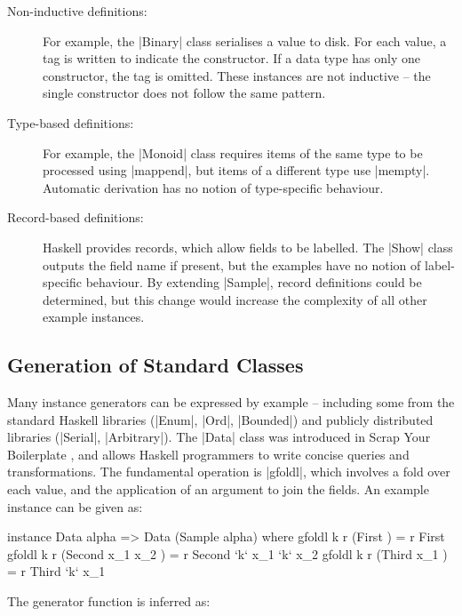 \documentclass[preprint,draft]{sigplanconf}
\begin{document}
\begin{description}

\item[Non-inductive definitions:] For example, the |Binary| class serialises a value to disk. For each value, a tag is written to indicate the constructor. If a data type has only one constructor, the tag is omitted. These instances are not inductive -- the single constructor does not follow the same pattern.

\item[Type-based definitions:] For example, the |Monoid| class requires items of the same type to be processed using |mappend|, but items of a different type use |mempty|. Automatic derivation has no notion of type-specific behaviour.

\item [Record-based definitions:] Haskell provides records, which allow fields to be labelled. The |Show| class outputs the field name if present, but the examples have no notion of label-specific behaviour. By extending |Sample|, record definitions could be determined, but this change would increase the complexity of all other example instances.

\end{description}

\subsection{Generation of Standard Classes}
\label{sec:automatic_success}

Many instance generators can be expressed by example -- including some from the standard Haskell libraries (|Enum|, |Ord|, |Bounded|) and publicly distributed libraries (|Serial|, |Arbitrary|). The |Data| class was introduced in Scrap Your Boilerplate \cite{lammel:syb}, and allows Haskell programmers to write concise queries and transformations. The fundamental operation is |gfoldl|, which involves a fold over each value, and the application of an argument to join the fields. An example instance can be given as:

\begin{code}
instance Data alpha => Data (Sample alpha) where
    gfoldl k r (First            ) = r First
    gfoldl k r (Second  x_1 x_2  ) = r Second  `k` x_1 `k` x_2
    gfoldl k r (Third   x_1      ) = r Third   `k` x_1
\end{code}

\noindent The generator function is inferred as:
\end{document}
